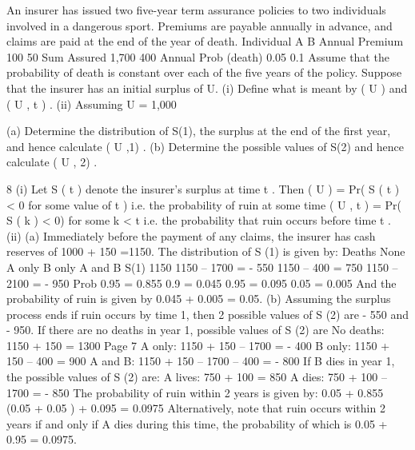 \documentclass[a4paper,12pt]{article}
\begin{document}
An insurer has issued two five-year term assurance policies to two individuals
involved in a dangerous sport. Premiums are payable annually in advance, and claims
are paid at the end of the year of death.
Individual
A
B
Annual
Premium
100
50
Sum Assured
1,700
400
Annual
Prob (death)
0.05
0.1
Assume that the probability of death is constant over each of the five years of the
policy. Suppose that the insurer has an initial surplus of U.
(i) Define what is meant by \psi ( U ) and \psi ( U , t ) .
(ii) Assuming U = 1,000

(a) Determine the distribution of S(1), the surplus at the end of the
first year, and hence calculate \psi ( U ,1) .
(b) Determine the possible values of S(2) and hence calculate \psi ( U , 2) .


8
(i)
Let S ( t ) denote the insurer’s surplus at time t . Then
\psi ( U ) = Pr( S ( t ) < 0 for some value of t ) i.e. the probability of ruin at some
time
\psi ( U , t ) = Pr( S ( k ) < 0) for some k < t i.e. the probability that ruin occurs
before time t .
(ii)
(a)
Immediately before the payment of any claims, the insurer has cash
reserves of 1000 + 150 =1150.
The distribution of S (1) is given by:
Deaths
None
A only
B only
A and B
S(1)
1150
1150 – 1700 = - 550
1150 – 400 = 750
1150 – 2100 = - 950
Prob
0.95  = 0.855
0.9  = 0.045
0.95  = 0.095
0.05  = 0.005
And the probability of ruin is given by 0.045 + 0.005 = 0.05.
(b)
Assuming the surplus process ends if ruin occurs by time 1, then 2
possible values of S (2) are - 550 and - 950.
If there are no deaths in year 1, possible values of S (2) are
No deaths: 1150 + 150 = 1300
Page 7%
A only: 1150 + 150 – 1700 = - 400
B only: 1150 + 150 – 400 = 900
A and B: 1150 + 150 – 1700 – 400 = - 800
If B dies in year 1, the possible values of S (2) are:
A lives: 750 + 100 = 850
A dies: 750 + 100 – 1700 = - 850
The probability of ruin within 2 years is given by:
0.05 + 0.855 \times  (0.05  + 0.05 ) + 0.095  = 0.0975
Alternatively, note that ruin occurs within 2 years if and only if A dies
during this time, the probability of which is 0.05 + 0.95  =
0.0975.
\end{document}
